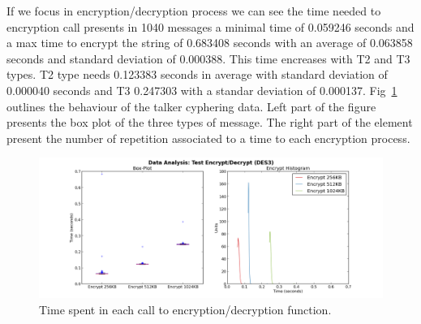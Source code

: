 \documentclass[journal,twoside]{JoPhA}
\begin{document}
If we focus in encryption/decryption process we can see the time needed to encryption call presents in 1040 messages 
a minimal time of 0.059246 seconds and a  max time to encrypt the string of  0.683408 seconds with an average of 0.063858 seconds and standard deviation of 0.000388.
This time encreases with T2 and T3 types. T2 type needs 0.123383 seconds in average with standard deviation of 0.000040 seconds and  T3  0.247303 with a standar deviation of 0.000137.
Fig~\ref{fig:text_encryption_time} outlines the behaviour of the talker cyphering data. Left part of the figure presents the box plot of the three types of message. The right part of the element present the number of repetition associated to a time to each encryption process.
\begin{figure}[ht]
    \centering
    \includegraphics[width=.9\textwidth]{Outline_encryption_text.png}
    \caption{Time spent in each call to encryption/decryption function.}
  \label{fig:text_encryption_time}
\end{figure}


\end{document}

